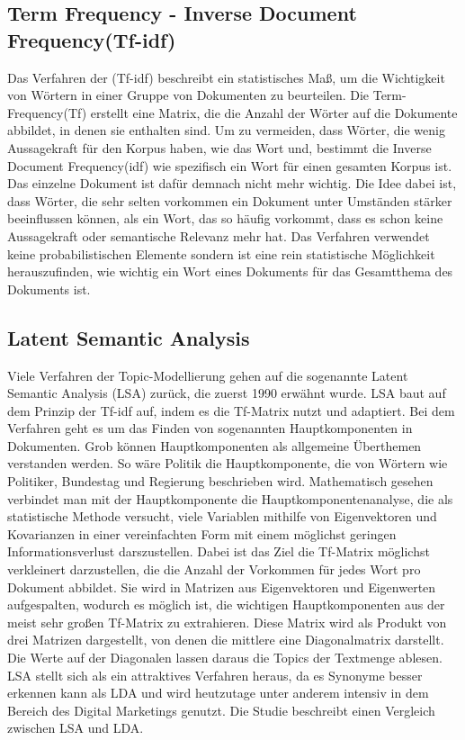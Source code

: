 \documentclass[german,version-2020-11]{uzl-thesis}
\begin{document}
\subsection{Term Frequency - Inverse Document Frequency(Tf-idf)}
Das Verfahren der (Tf-idf) beschreibt ein statistisches Maß, um die Wichtigkeit von Wörtern in einer Gruppe von Dokumenten zu beurteilen. Die Term-Frequency(Tf) erstellt eine Matrix, die die Anzahl der Wörter auf die Dokumente abbildet, in denen sie enthalten sind. Um zu vermeiden, dass Wörter, die wenig Aussagekraft für den Korpus haben, wie das Wort \glqq und\grqq, bestimmt die Inverse Document Frequency(idf) wie spezifisch ein Wort für einen gesamten Korpus ist. Das einzelne Dokument ist dafür demnach nicht mehr wichtig. Die Idee dabei ist, dass Wörter, die sehr selten vorkommen ein Dokument unter Umständen stärker beeinflussen können, als ein Wort, das so häufig vorkommt, dass es schon keine Aussagekraft oder semantische Relevanz mehr hat. Das Verfahren verwendet keine probabilistischen Elemente sondern ist eine rein statistische Möglichkeit herauszufinden, wie wichtig ein Wort eines Dokuments für das Gesamtthema des Dokuments ist. 

\subsection{Latent Semantic Analysis}
Viele Verfahren der Topic-Modellierung gehen auf die sogenannte Latent Semantic Analysis (LSA) zurück, die zuerst 1990 erwähnt wurde. LSA baut auf dem Prinzip der Tf-idf auf, indem es die Tf-Matrix nutzt und adaptiert. Bei dem Verfahren geht es um das Finden von sogenannten Hauptkomponenten in Dokumenten. Grob können Hauptkomponenten als allgemeine Überthemen verstanden werden. So wäre Politik die Hauptkomponente, die von Wörtern wie Politiker, Bundestag und Regierung beschrieben wird. Mathematisch gesehen verbindet man mit der Hauptkomponente die Hauptkomponentenanalyse, die als statistische Methode versucht, viele Variablen mithilfe von Eigenvektoren und Kovarianzen in einer vereinfachten Form mit einem möglichst geringen Informationsverlust darszustellen. Dabei ist das Ziel die Tf-Matrix möglichst verkleinert darzustellen, die die Anzahl der Vorkommen für jedes Wort pro Dokument abbildet. Sie wird in Matrizen aus Eigenvektoren und Eigenwerten aufgespalten, wodurch es möglich ist, die wichtigen Hauptkomponenten aus der meist sehr großen Tf-Matrix zu extrahieren. Diese Matrix wird als Produkt von drei Matrizen dargestellt, von denen die mittlere eine Diagonalmatrix darstellt. Die Werte auf der Diagonalen lassen daraus die Topics der Textmenge ablesen. LSA stellt sich als ein attraktives Verfahren heraus, da es Synonyme besser erkennen kann als LDA und wird heutzutage unter anderem intensiv in dem Bereich des Digital Marketings genutzt. Die Studie \cite{t1} beschreibt einen Vergleich zwischen LSA und LDA. 
\end{document}
